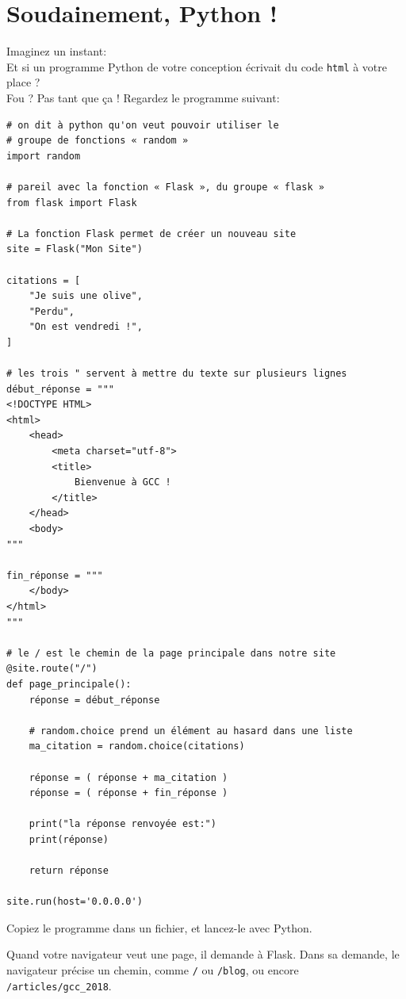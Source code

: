 \section{Soudainement, Python !}

Imaginez un instant:\\
Et si un programme Python de votre conception écrivait du code \texttt{html} à
votre place ?\\

Fou ? Pas tant que ça ! Regardez le programme suivant:

\begin{verbatim}
# on dit à python qu'on veut pouvoir utiliser le
# groupe de fonctions « random »
import random

# pareil avec la fonction « Flask », du groupe « flask »
from flask import Flask

# La fonction Flask permet de créer un nouveau site
site = Flask("Mon Site")

citations = [
    "Je suis une olive",
    "Perdu",
    "On est vendredi !",
]

# les trois " servent à mettre du texte sur plusieurs lignes
début_réponse = """
<!DOCTYPE HTML>
<html>
    <head>
        <meta charset="utf-8">
        <title>
            Bienvenue à GCC !
        </title>
    </head>
    <body>
"""

fin_réponse = """
    </body>
</html>
"""

# le / est le chemin de la page principale dans notre site
@site.route("/")
def page_principale():
    réponse = début_réponse

    # random.choice prend un élément au hasard dans une liste
    ma_citation = random.choice(citations)

    réponse = ( réponse + ma_citation )
    réponse = ( réponse + fin_réponse )

    print("la réponse renvoyée est:")
    print(réponse)

    return réponse

site.run(host='0.0.0.0')
\end{verbatim}

\begin{exercise}
  Copiez le programme dans un fichier, et lancez-le avec Python.
\end{exercise}

Quand votre navigateur veut une page, il demande à Flask. Dans sa demande, le
navigateur précise un chemin, comme \texttt{/} ou \texttt{/blog}, ou encore
\texttt{/articles/gcc\_2018}.\\

